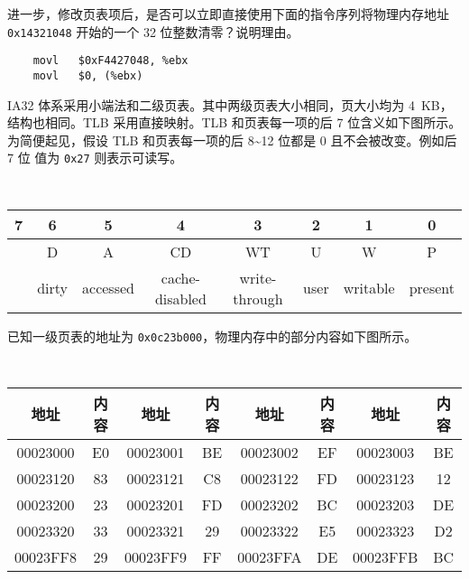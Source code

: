 \begin{problems}
        进一步，修改页表项后，是否可以立即直接使用下面的指令序列将物理内存地址 \verb|0x14321048| 开始的一个 32 位整数清零？说明理由。
        \begin{verbatim}
    movl   $0xF4427048, %ebx
    movl   $0, (%ebx)
        \end{verbatim}
         IA32 体系采用小端法和二级页表。其中两级页表大小相同，页大小均为 \SI{4}{KB}，结构也相同。TLB 采用直接映射。TLB 和页表每一项的后 7 位含义如下图所示。为简便起见，假设 TLB 和页表每一项的后 8\textasciitilde 12 位都是 0 且不会被改变。例如后 7 位 值为 \verb|0x27| 则表示可读写。
        \begin{table}[H]
            \tt
            \centering
            \begin{tabular}{cccccccc}
                {\footnotesize 7} & {\footnotesize 6} & {\footnotesize 5} & {\footnotesize 4} & {\footnotesize 3} & {\footnotesize 2} & {\footnotesize 1} & {\footnotesize 0} \\ \hline
                \multicolumn{1}{|c|}{\cellcolor{gray!50}} & \multicolumn{1}{c|}{D} & \multicolumn{1}{c|}{A} & \multicolumn{1}{c|}{CD} & \multicolumn{1}{c|}{WT} & \multicolumn{1}{c|}{U} & \multicolumn{1}{c|}{W} & \multicolumn{1}{c|}{P} \\ \hline
                & {\footnotesize dirty} & {\footnotesize accessed} & {\footnotesize cache-disabled} & {\footnotesize write-through} & {\footnotesize user} & {\footnotesize writable} & {\footnotesize present}
            \end{tabular}
        \end{table}
        已知一级页表的地址为 \verb|0x0c23b000|，物理内存中的部分内容如下图所示。
        \begin{table}[H]
            \tt
            \centering
            \begin{tabular}{|c|c|c|c|c|c|c|c|}
                \hline
                地址 & 内容 & 地址 & 内容 & 地址 & 内容 & 地址 & 内容 \\ \hline
                00023000 & E0 & 00023001 & BE & 00023002 & EF & 00023003 & BE \\ \hline
                00023120 & 83 & 00023121 & C8 & 00023122 & FD & 00023123 & 12 \\ \hline
                00023200 & 23 & 00023201 & FD & 00023202 & BC & 00023203 & DE \\ \hline
                00023320 & 33 & 00023321 & 29 & 00023322 & E5 & 00023323 & D2 \\ \hline
                00023FF8 & 29 & 00023FF9 & FF & 00023FFA & DE & 00023FFB & BC \\ \hline

\end{tabular}
\end{table}
\end{problems}
